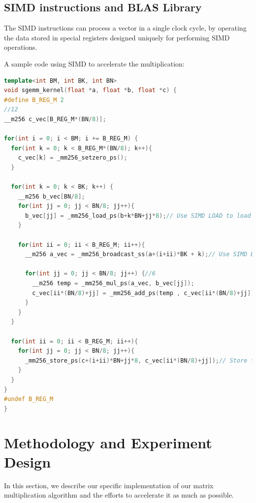 \documentclass[UTF8]{ctexart}
\begin{document}
\subsection{SIMD instructions and BLAS Library}
\label{subsec::SIMDIaBLASL}
The SIMD instructions can process a vector in a single clock cycle, by operating the data stored in special registers designed uniquely for performing SIMD operations.

A sample code using SIMD to accelerate the multiplication:

\begin{lstlisting}[language=C++,style=C++]
  template<int BM, int BK, int BN>
void sgemm_kernel(float *a, float *b, float *c) {
#define B_REG_M 2
//12
__m256 c_vec[B_REG_M*(BN/8)];

for(int i = 0; i < BM; i += B_REG_M) {
  for(int k = 0; k < B_REG_M*(BN/8); k++){
    c_vec[k] = _mm256_setzero_ps();
  }

  for(int k = 0; k < BK; k++) {
    __m256 b_vec[BN/8];
    for(int jj = 0; jj < BN/8; jj++){
      b_vec[jj] = _mm256_load_ps(b+k*BN+jj*8);// Use SIMD LOAD to load data into XMM registers
    }

    for(int ii = 0; ii < B_REG_M; ii++){
      __m256 a_vec = _mm256_broadcast_ss(a+(i+ii)*BK + k);// Use SIMD BROADCAST to broadcast data along with the internal bus

      for(int jj = 0; jj < BN/8; jj++) {//6
        __m256 temp = _mm256_mul_ps(a_vec, b_vec[jj]);
        c_vec[ii*(BN/8)+jj] = _mm256_add_ps(temp , c_vec[ii*(BN/8)+jj]);// SIMD add operation
      }
    }
  }

  for(int ii = 0; ii < B_REG_M; ii++){
    for(int jj = 0; jj < BN/8; jj++){
      _mm256_store_ps(c+(i+ii)*BN+jj*8, c_vec[ii*(BN/8)+jj]);// Store the data from XMM registers to RAM
    }
  }
}
#undef B_REG_M
}
\end{lstlisting}

\section{Methodology and Experiment Design}
\label{sec::ExpDesign}
In this section, we describe our specific implementation of our matrix
multiplication algorithm and the efforts to accelerate it as much as
possible.
\end{document}
